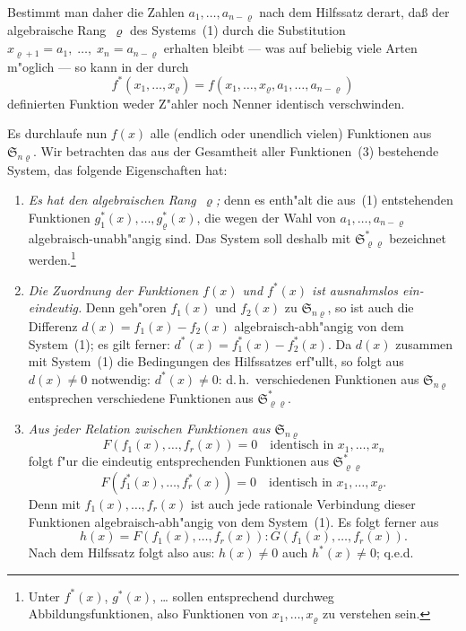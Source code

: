 \documentclass[11pt,a4paper]{article}
\begin{document}
Bestimmt man daher die Zahlen $a_{1},\dots,a_{n-\varrho}$ nach dem Hilfssatz derart,
da\ss{} der algebraische Rang~$\varrho$ des Systems~(1) durch die Substitution
$x_{\varrho+1}=a_{1},\;\dots,\;x_{n}=a_{n-\varrho}$ erhalten bleibt --- was auf beliebig viele Arten
m"{o}glich --- so kann in der durch
\begin{equation}
f^{*}(x_{1},\dots,x_{\varrho})=f(x_{1},\dots,x_{\varrho},a_{1},\dots,a_{n-\varrho})
\tag{3}
\end{equation}
definierten Funktion weder Z"{a}hler noch Nenner identisch verschwinden.

Es durchlaufe nun $f(x)$ alle (endlich oder unendlich vielen) Funktionen
aus $\mathfrak{S}_{n\varrho}$. Wir betrachten das aus der Gesamtheit aller Funktionen~(3)
bestehende System, das folgende Eigenschaften hat:
\begin{enumerate}
\item \emph{Es hat den algebraischen Rang~$\varrho$;} denn es enth"{a}lt die aus~(1)
entstehenden Funktionen $g_{1}^{*}(x),\dots,g_{\varrho}^{*}(x)$, die wegen der Wahl von
$a_{1},\dots,a_{n-\varrho}$ algebraisch-unabh"{a}ngig sind. Das System soll deshalb mit
$\mathfrak{S}_{\varrho\varrho}^{*}$ bezeichnet werden.\footnote{Unter $f^{*}(x)$, $g^{*}(x)$, \dots{} sollen entsprechend
durchweg Abbildungsfunktionen, also Funktionen von $x_{1},\dots,x_{\varrho}$ zu verstehen sein.}

\item \emph{Die Zuordnung der Funktionen $f(x)$ und $f^{*}(x)$ ist ausnahmslos
ein-eindeutig.} Denn geh"{o}ren $f_{1}(x)$ und $f_{2}(x)$ zu $\mathfrak{S}_{n\varrho}$, so ist auch die Differenz
$d(x)=f_{1}(x)-f_{2}(x)$ algebraisch-abh"{a}ngig von dem System~(1); es gilt ferner:
$d^{*}(x)=f_{1}^{*}(x)-f_{2}^{*}(x)$. Da $d(x)$ zusammen mit System~(1) die Bedingungen
des Hilfssatzes erf"{u}llt, so folgt aus $d(x)\neq 0$ notwendig: $d^{*}(x)\neq 0$:
d.\,h.\ verschiedenen Funktionen aus $\mathfrak{S}_{n\varrho}$ entsprechen verschiedene Funktionen
aus $\mathfrak{S}_{\varrho\varrho}^{*}$.

\item \emph{Aus jeder Relation zwischen Funktionen aus $\mathfrak{S}_{n\varrho}$}
\[F(f_{1}(x),\dots,f_{r}(x))=0\quad\text{identisch in }x_{1},\dots,x_{n}\]
folgt f"{u}r die eindeutig entsprechenden Funktionen aus $\mathfrak{S}_{\varrho\varrho}^{*}$
\[F(f_{1}^{*}(x),\dots,f_{r}^{*}(x))=0\quad\text{identisch in }x_{1},\dots,x_{\varrho}.\]
Denn mit $f_{1}(x),\dots,f_{r}(x)$ ist auch jede rationale Verbindung dieser
Funktionen algebraisch-abh"{a}ngig von dem System~(1). Es folgt ferner aus
\begin{equation}
h(x)=F(f_{1}(x),\dots,f_{r}(x)):G(f_{1}(x),\dots,f_{r}(x)).
\tag{4}
\end{equation}
Nach dem Hilfssatz folgt also aus: $h(x)\neq 0$ auch $h^{*}(x)\neq 0$; q.e.d.
\end{enumerate}
\end{document}
